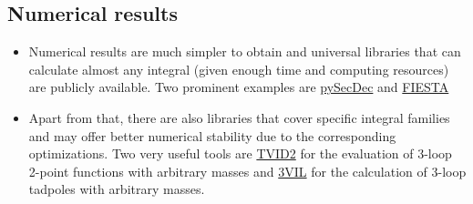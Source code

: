 \documentclass[../FeynCalcManual.tex]{subfiles}
\begin{document}
\hypertarget{numerical-results}{%
\subsection{Numerical results}\label{numerical-results}}

\begin{itemize}
\tightlist
\item
  Numerical results are much simpler to obtain and universal libraries
  that can calculate almost any integral (given enough time and
  computing resources) are publicly available. Two prominent examples
  are \href{https://secdec.readthedocs.io/en/stable/}{pySecDec} and
  \href{https://bitbucket.org/feynmanIntegrals/fiesta/src/master/}{FIESTA}
\item
  Apart from that, there are also libraries that cover specific integral
  families and may offer better numerical stability due to the
  corresponding optimizations. Two very useful tools are
  \href{https://sites.pitt.edu/~afreitas/}{TVID2} for the evaluation of
  3-loop 2-point functions with arbitrary masses and
  \href{https://www.niu.edu/spmartin/3VIL/}{3VIL} for the calculation of
  3-loop tadpoles with arbitrary masses.
\end{itemize}
\end{document}
